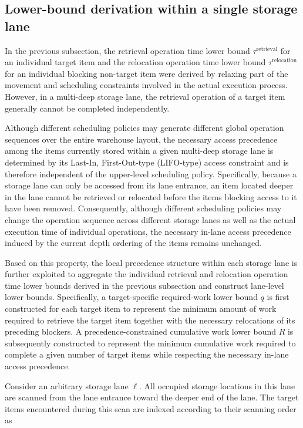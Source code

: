 \subsection{Lower-bound derivation within a single storage lane}

In the previous subsection, the retrieval operation time lower bound
\(\tau^{\mathrm{retrieval}}\) for an individual target item and the relocation
operation time lower bound \(\tau^{\mathrm{relocation}}\) for an individual
blocking non-target item were derived by relaxing part of the movement and
scheduling constraints involved in the actual execution process. However, in a
multi-deep storage lane, the retrieval operation of a target item generally
cannot be completed independently.

Although different scheduling policies may generate different global operation
sequences over the entire warehouse layout, the necessary access precedence
among the items currently stored within a given multi-deep storage lane is
determined by its Last-In, First-Out-type (LIFO-type) access constraint and is
therefore independent of the upper-level scheduling policy. Specifically,
because a storage lane can only be accessed from its lane entrance, an item
located deeper in the lane cannot be retrieved or relocated before the items
blocking access to it have been removed. Consequently, although different
scheduling policies may change the operation sequence across different storage
lanes as well as the actual execution time of individual operations, the
necessary in-lane access precedence induced by the current depth ordering of
the items remains unchanged.

Based on this property, the local precedence structure within each storage lane
is further exploited to aggregate the individual retrieval and relocation
operation time lower bounds derived in the previous subsection and construct
lane-level lower bounds. Specifically, a target-specific required-work lower
bound \(q\) is first constructed for each target item to represent the minimum
amount of work required to retrieve the target item together with the necessary
relocations of its preceding blockers. A precedence-constrained cumulative work
lower bound \(R\) is subsequently constructed to represent the minimum
cumulative work required to complete a given number of target items while
respecting the necessary in-lane access precedence.

Consider an arbitrary storage lane \(\ell\). All occupied storage locations in
this lane are scanned from the lane entrance toward the deeper end of the lane.
The target items encountered during this scan are indexed according to their
scanning order as

